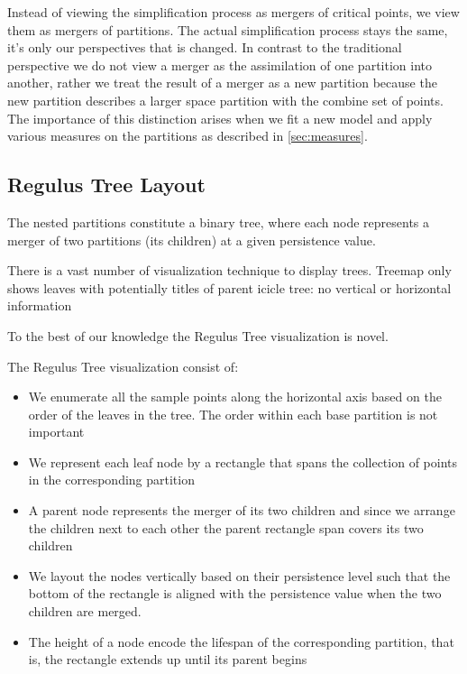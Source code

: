 Instead of viewing the simplification process as mergers of critical points, we view them as mergers of partitions. The actual simplification process stays the same, it's only our perspectives that is changed. In contrast to the traditional perspective we do not view a merger as the assimilation of one partition into another, rather we treat the result of a merger as a new partition because the new partition describes a larger space partition with the combine set of points. The importance of this distinction arises when we fit a new model and apply various measures on the partitions as described in \ref{sec:measures}.

\subsection{Regulus Tree Layout}
\label{sec:tree}
The nested partitions constitute a binary tree, where each node represents a merger of two partitions (its children) at a given persistence value. 

There is a vast number of visualization technique to display trees.
Treemap only shows leaves with potentially titles of parent
icicle tree: no vertical or horizontal information

To the best of our knowledge the Regulus Tree visualization is novel. 

The Regulus Tree visualization consist of:
\begin{itemize}
    \item  We enumerate all the sample points along the horizontal axis based on the order of the leaves in the tree. The order within each base partition is not important

    \item We represent each leaf node by a rectangle that spans the collection of points in the corresponding partition

    \item A parent node represents the merger of its two children and since we arrange the children next to each other the parent rectangle span covers its two children

    \item  We layout the nodes vertically based on their persistence level such that the bottom of the rectangle is aligned with the persistence value when the two children are merged.

    \item  The height of a node encode the lifespan of the corresponding partition, that is, the rectangle extends up until its parent begins
\end{itemize}

